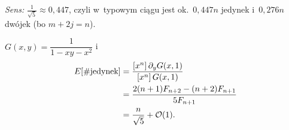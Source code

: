 \documentclass[11pt]{article}
\begin{document}
\emph{Sens:} $\frac1{\sqrt5}\approx0{,}447$, czyli w~typowym ciągu jest
ok.\ $0{,}447n$ jedynek i~$0{,}276n$ dwójek (bo $m+2j=n$).
\begin{odpowiedz}
$G(x,y)=\dfrac1{1-xy-x^2}$ i
\begin{align*}
E[\#\text{jedynek}]&=\frac{[x^n]\,\partial_yG(x,1)}{[x^n]\,G(x,1)}\\
&=\frac{2(n+1)F_{n+2}-(n+2)F_{n+1}}{5F_{n+1}}\\
&=\frac{n}{\sqrt5}+\mathcal{O}(1).
\end{align*}
\end{odpowiedz}
\end{document}
